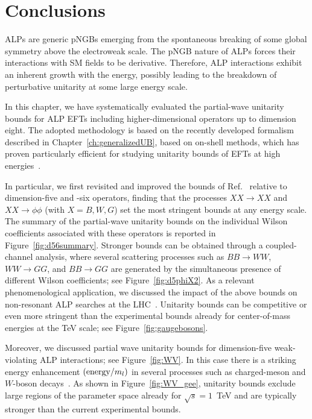 \section{Conclusions\label{sec:ALPUBconclusions}}

ALPs are generic pNGBs emerging from the spontaneous breaking of some global symmetry 
above the electroweak scale. The pNGB nature of ALPs forces their interactions with SM fields to be derivative. Therefore, ALP interactions exhibit an inherent growth with the energy, possibly leading to the breakdown of perturbative unitarity at some large energy scale. 

In this chapter, we have systematically evaluated the partial-wave unitarity bounds for ALP EFTs including higher-dimensional operators up to dimension eight. The adopted methodology is based on the recently developed formalism described in Chapter~\ref{ch:generalizedUB}, based on on-shell methods, which has proven particularly efficient for studying unitarity bounds of EFTs at high energies~\cite{Bresciani:2025toe}.

In particular, we first revisited and improved the bounds of Ref.~\cite{Brivio:2021fog} relative to dimension-five and -six operators, finding that the processes $XX \to XX$ and $XX \to \phi \phi$ (with $X=B,W,G$) set the most stringent bounds at any energy scale.
The summary of the partial-wave unitarity bounds on the individual
Wilson coefficients associated with these operators is reported in 
Figure~\ref{fig:d56summary}.
Stronger bounds can be obtained through a coupled-channel analysis, 
where several scattering processes such as $BB \to WW$, $WW \to GG$, 
and $BB \to GG$ are generated by the simultaneous presence of different
Wilson coefficients; see Figure~\ref{fig:d5phiX2}.
As a relevant phenomenological application, we discussed the 
impact of the above bounds on non-resonant ALP searches at the LHC~\cite{Gavela:2019cmq}. Unitarity bounds can be competitive or even more stringent than the experimental bounds already for center-of-mass energies at the TeV scale; see Figure~\ref{fig:gaugebosons}. 

Moreover, we discussed partial wave unitarity bounds for dimension-five 
weak-violating ALP interactions; see Figure~\ref{fig:WV}. In this 
case there is a striking energy enhancement $({\rm energy}/m_l)$ 
in several processes such as charged-meson and $W$-boson decays~\cite{Altmannshofer:2022ckw}.
As shown in Figure~\ref{fig:WV_gee}, unitarity bounds exclude large regions of the parameter space already for $\sqrt{s} = 1$~TeV and 
are typically stronger than the current experimental bounds.

